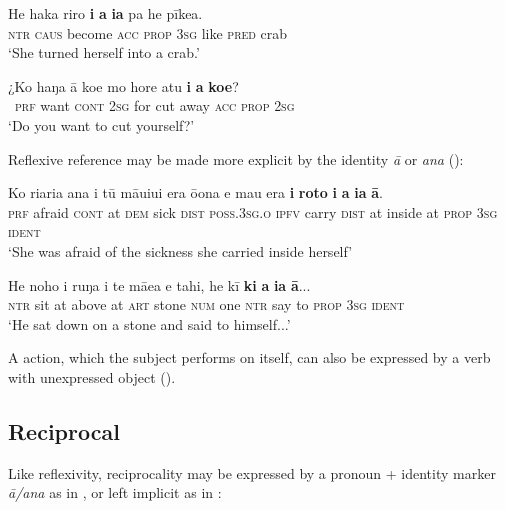 \ea\label{ex:8.185}
\gll He haka riro \textbf{i} \textbf{a} \textbf{ia} pa he pīkea. \\
\textsc{ntr} \textsc{caus} become \textsc{acc} \textsc{prop} \textsc{3sg} like \textsc{pred} crab \\

\glt 
‘She turned herself into a crab.’ \textstyleExampleref{[R310.050]} 
\z

\ea\label{ex:8.186}
\gll ¿Ko haŋa {\ꞌ}ā koe mo hore atu \textbf{i} \textbf{a} \textbf{koe}? \\
~\textsc{prf} want \textsc{cont} \textsc{2sg} for cut away \textsc{acc} \textsc{prop} \textsc{2sg} \\

\glt
‘Do you want to cut yourself?’ \textstyleExampleref{[R428.009]} 
\z

Reflexive reference may be made more explicit by the identity  \textit{{\ꞌ}ā} or \textit{{\ꞌ}ana} ():

\ea\label{ex:8.187}
\gll Ko ri{\ꞌ}ari{\ꞌ}a {\ꞌ}ana {\ꞌ}i tū māuiui era ō{\ꞌ}ona e ma{\ꞌ}u era  \textbf{{\ꞌ}i} \textbf{roto} \textbf{i} \textbf{a} \textbf{ia} \textbf{{\ꞌ}ā}.\\
\textsc{prf} afraid \textsc{cont} at \textsc{dem} sick \textsc{dist} \textsc{poss.3sg.o} \textsc{ipfv} carry \textsc{dist}  at inside at \textsc{prop} \textsc{3sg} \textsc{ident}\\

\glt 
‘She was afraid of the sickness she carried inside herself’ \textstyleExampleref{[R301.091]} 
\z

\ea\label{ex:8.188}
\gll He noho {\ꞌ}i ruŋa i te mā{\ꞌ}ea e tahi, he kī \textbf{ki} \textbf{a} \textbf{ia} \textbf{{\ꞌ}ā}...\\
\textsc{ntr} sit at above at \textsc{art} stone \textsc{num} one \textsc{ntr} say to \textsc{prop} \textsc{3sg} \textsc{ident}\\

\glt
‘He sat down on a stone and said to himself...’ \textstyleExampleref{[R229.365]} 
\z

A  action, which the subject performs on itself, can also be expressed by a  verb with unexpressed object ().

\subsection{Reciprocal}
Like reflexivity, reciprocality may be expressed by a pronoun + identity marker \textit{{\ꞌ}ā/{\ꞌ}ana} as in , or left implicit as in :

